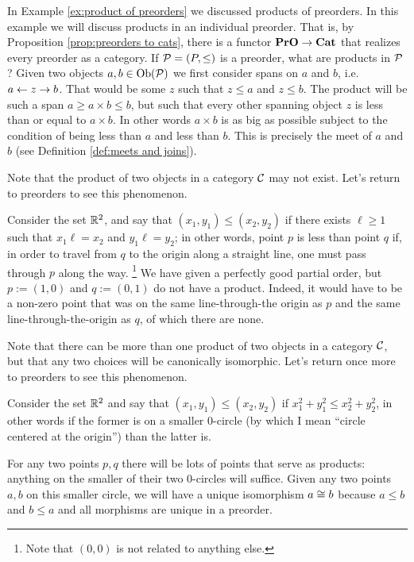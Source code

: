 \begin{example}

In Example \ref{ex:product of preorders} we discussed products of preorders. In this example we will discuss products in an individual preorder. That is, by Proposition \ref{prop:preorders to cats}, there is a functor ${\bf PrO}\rightarrow{\bf Cat}$ that realizes every preorder as a category. If $\mathcal{P}=(P,\leq)$ is a preorder, what are products in $\mathcal{P}$? Given two objects $a,b\in\textnormal{Ob}(\mathcal{P})$ we first consider spans on $a$ and $b$, i.e. $a\leftarrow z\rightarrow b$. That would be some $z$ such that $z\leq a$ and $z\leq b$. The product will be such a span $a\geq a\times b\leq b$, but such that every other spanning object $z$ is less than or equal to $a\times b$. In other words $a\times b$ is as big as possible subject to the condition of being less than $a$ and less than $b$. This is precisely the meet of $a$ and $b$ (see Definition \ref{def:meets and joins}). 

\end{example}

\begin{example}\label{ex:products dont exist}

Note that the product of two objects in a category $\mathcal{C}$ may not exist. Let's return to preorders to see this phenomenon.

Consider the set ${\mathbb R}^2$, and say that $(x_1,y_1)\leq (x_2,y_2)$ if there exists $\ell\geq 1$ such that $x_1\ell=x_2$ and $y_1\ell=y_2$; in other words, point $p$ is less than point $q$ if, in order to travel from $q$ to the origin along a straight line, one must pass through $p$ along the way. 
\footnote{Note that $(0,0)$ is not related to anything else.} 
We have given a perfectly good partial order, but $p:=(1,0)$ and $q:=(0,1)$ do not have a product. Indeed, it would have to be a non-zero point that was on the same line-through-the origin as $p$ and the same line-through-the-origin as $q$, of which there are none.

\end{example}

\begin{example}

Note that there can be more than one product of two objects in a category $\mathcal{C}$, but that any two choices will be canonically isomorphic. Let's return once more to preorders to see this phenomenon.

Consider the set ${\mathbb R}^2$ and say that $(x_1,y_1)\leq (x_2,y_2)$ if $x_1^2+y_1^2\leq x_2^2+y_2^2$, in other words if the former is on a smaller 0-circle (by which I mean “circle centered at the origin”) than the latter is. 

For any two points $p,q$ there will be lots of points that serve as products: anything on the smaller of their two 0-circles will suffice. Given any two points $a,b$ on this smaller circle, we will have a unique isomorphism $a\cong b$ because $a\leq b$ and $b\leq a$ and all morphisms are unique in a preorder.

\end{example}

